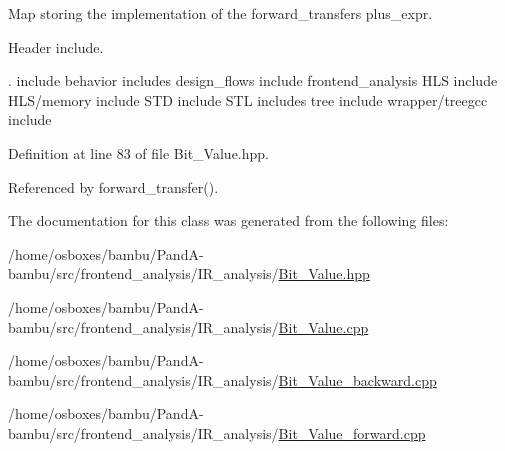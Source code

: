Map storing the implementation of the forward\+\_\+transfer\textquotesingle{}s plus\+\_\+expr. 

Header include.

. include behavior includes design\+\_\+flows include frontend\+\_\+analysis H\+LS include H\+L\+S/memory include S\+TD include S\+TL includes tree include wrapper/treegcc include 

Definition at line 83 of file Bit\+\_\+\+Value.\+hpp.



Referenced by forward\+\_\+transfer().



The documentation for this class was generated from the following files\+:\begin{DoxyCompactItemize}
\item 
/home/osboxes/bambu/\+Pand\+A-\/bambu/src/frontend\+\_\+analysis/\+I\+R\+\_\+analysis/\hyperlink{Bit__Value_8hpp}{Bit\+\_\+\+Value.\+hpp}\item 
/home/osboxes/bambu/\+Pand\+A-\/bambu/src/frontend\+\_\+analysis/\+I\+R\+\_\+analysis/\hyperlink{Bit__Value_8cpp}{Bit\+\_\+\+Value.\+cpp}\item 
/home/osboxes/bambu/\+Pand\+A-\/bambu/src/frontend\+\_\+analysis/\+I\+R\+\_\+analysis/\hyperlink{Bit__Value__backward_8cpp}{Bit\+\_\+\+Value\+\_\+backward.\+cpp}\item 
/home/osboxes/bambu/\+Pand\+A-\/bambu/src/frontend\+\_\+analysis/\+I\+R\+\_\+analysis/\hyperlink{Bit__Value__forward_8cpp}{Bit\+\_\+\+Value\+\_\+forward.\+cpp}\end{DoxyCompactItemize}
